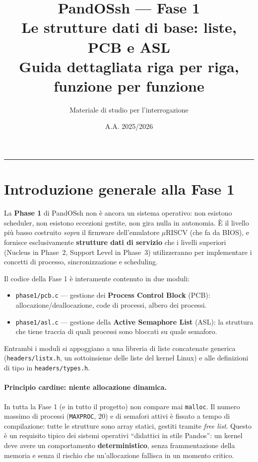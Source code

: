 \documentclass[11pt,a4paper]{article}
\title{\textbf{PandOSsh --- Fase 1}\\[2pt]
\large Le strutture dati di base: liste, PCB e ASL\\
\normalsize Guida dettagliata riga per riga, funzione per funzione}
\author{Materiale di studio per l'interrogazione}
\date{A.A. 2025/2026}
\newcommand{\code}[1]{\texttt{#1}}
\begin{document}
\maketitle
\tableofcontents
\bigskip
\hrule
\bigskip

\section{Introduzione generale alla Fase 1}

La \textbf{Phase 1} di PandOSsh non è ancora un sistema operativo: non
esistono scheduler, non esistono eccezioni gestite, non gira nulla in
autonomia. È il livello più basso costruito \emph{sopra} il firmware
dell'emulatore $\mu$RISCV (che fa da BIOS), e fornisce esclusivamente
\textbf{strutture dati di servizio} che i livelli superiori (Nucleus in
Phase~2, Support Level in Phase~3) utilizzeranno per implementare i concetti
di processo, sincronizzazione e scheduling.

Il codice della Fase 1 è interamente contenuto in due moduli:

\begin{itemize}
\item \code{phase1/pcb.c} --- gestione dei \textbf{Process Control Block}
  (PCB): allocazione/deallocazione, code di processi, albero dei processi.
\item \code{phase1/asl.c} --- gestione della \textbf{Active Semaphore List}
  (ASL): la struttura che tiene traccia di quali processi sono bloccati su
  quale semaforo.
\end{itemize}

Entrambi i moduli si appoggiano a una libreria di liste concatenate generica
(\code{headers/listx.h}, un sottoinsieme delle liste del kernel Linux) e alle
definizioni di tipo in \code{headers/types.h}.

\paragraph{Principio cardine: niente allocazione dinamica.}
In tutta la Fase 1 (e in tutto il progetto) non compare mai \code{malloc}.
Il numero massimo di processi (\code{MAXPROC}, 20) e di semafori attivi è
fissato a tempo di compilazione: tutte le strutture sono array statici,
gestiti tramite \emph{free list}. Questo è un requisito tipico dei sistemi
operativi ``didattici in stile Pandos'': un kernel deve avere un
comportamento \textbf{deterministico}, senza frammentazione della memoria e
senza il rischio che un'allocazione fallisca in un momento critico.
\end{document}
